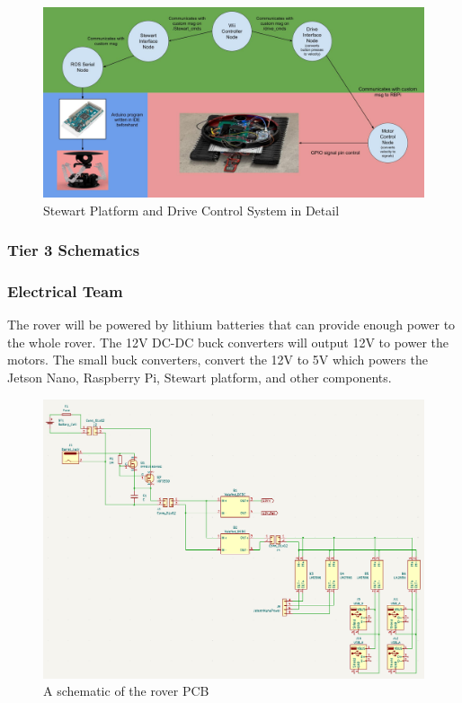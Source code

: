 \documentclass[a4paper, 10pt]{article}
\begin{document}
		\begin{figure} [!h]
			\centering
			\includegraphics[scale=0.6]{Photos/Tier 2 Control Software Architecture.jpg}
			\caption{Stewart Platform and Drive Control System in Detail}
			\label{control_schema}
		\end{figure}
\pagebreak
\clearpage
	\subsubsection{Tier 3 Schematics}

		\subsubsection*{Electrical Team}
		The rover will be powered by lithium batteries that can provide enough power to the whole rover. The 12V DC-DC buck converters will output 12V to power the motors. The small buck converters, convert the 12V to 5V which powers the Jetson Nano, Raspberry Pi, Stewart platform, and other components. 
		
		\begin{figure} [!h]
			\centering
			\includegraphics[scale=0.9]{Photos/Rover schematic 1}
			\caption{A schematic of the rover PCB}
			\label{rover_PCB_1}
		\end{figure}
\end{document}
